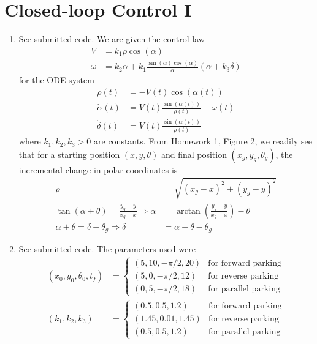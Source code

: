 \documentclass[12pt]{article}
\begin{document}
\section{Closed-loop Control I}
\begin{enumerate}
	\item See submitted code. We are given the control law
	\begin{align*}
		V &= k_1\rho\cos(\alpha) \\
		\omega &= k_2\alpha + k_1\frac{\sin(\alpha)\cos(\alpha)}{\alpha}(\alpha + k_3\delta)
	\end{align*}
	for the ODE system
	\begin{align*}
		\dot \rho(t) &= -V(t)\cos(\alpha(t)) \\
		\dot \alpha(t) &= V(t)\frac{\sin(\alpha(t))}{\rho(t)} - \omega(t) \\
		\dot \delta(t) &= V(t)\frac{\sin(\alpha(t))}{\rho(t)}
	\end{align*}
	where $k_1,k_2,k_3 > 0$ are constants. From Homework 1, Figure 2, we readily see that for a starting position $(x,y,\theta)$ and final position $(x_g,y_g,\theta_g)$, the incremental change in polar coordinates is
	\begin{align*}
		\rho &= \sqrt{(x_g - x)^2 + (y_g - y)^2} \\
		\tan(\alpha + \theta) = \frac{y_g - y}{x_g - x} \Rightarrow \alpha &= \arctan{\left(\frac{y_g - y}{x_g - x}\right)} - \theta \\
		\alpha + \theta = \delta + \theta_g \Rightarrow \delta &= \alpha + \theta - \theta_g
	\end{align*}
	\item See submitted code. The parameters used were
	\begin{align*}
		(x_0,y_0,\theta_0,t_f) &=
		\begin{cases}
			(5,10,-\pi/2,20) & \mbox{for forward parking} \\
			(5,0,-\pi/2,12) & \mbox{for reverse parking} \\
			(0,5,-\pi/2,18) & \mbox{for parallel parking}
		\end{cases} \\
		(k_1,k_2,k_3) &=
		\begin{cases}
			(0.5,0.5,1.2) & \mbox{for forward parking} \\
			(1.45,0.01,1.45) & \mbox{for reverse parking} \\
			(0.5,0.5,1.2) & \mbox{for parallel parking}
		\end{cases}
	\end{align*}

\end{enumerate}
\end{document}
